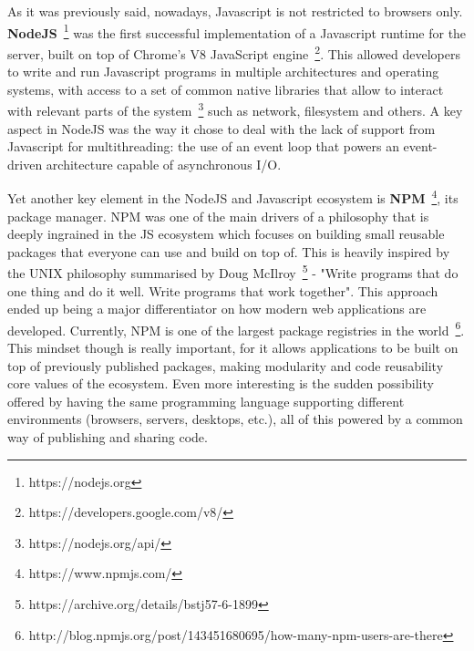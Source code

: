 As it was previously said, nowadays, Javascript is not restricted to
browsers only. \textbf{NodeJS}~\footnote{https://nodejs.org} was the first
successful implementation of a Javascript runtime for the server, built
on top of Chrome's V8 JavaScript engine~\footnote{https://developers.google.com/v8/}. This
allowed developers to write and run Javascript programs in multiple
architectures and operating systems, with access to a set of common
native libraries that allow to interact with relevant parts of the
system~\footnote{https://nodejs.org/api/} such as network, filesystem and
others. A key aspect in NodeJS was the way it chose to deal with the
lack of support from Javascript for multithreading: the use of an event
loop that powers an event-driven architecture capable of asynchronous
I/O.

Yet another key element in the NodeJS and Javascript ecosystem is
\textbf{NPM}~\footnote{https://www.npmjs.com/}, its package manager. NPM was one
of the main drivers of a philosophy that is deeply ingrained in the JS
ecosystem which focuses on building small reusable packages that
everyone can use and build on top of. This is heavily inspired by the
UNIX philosophy summarised by Doug McIlroy~\footnote{https://archive.org/details/bstj57-6-1899} - "Write
programs that do one thing and do it well. Write programs that work
together". This approach ended up being a major differentiator on how
modern web applications are developed. Currently, NPM is one of the
largest package registries in the world~\footnote{http://blog.npmjs.org/post/143451680695/how-many-npm-users-are-there}.
This mindset though is really important, for it allows applications to
be built on top of previously published packages, making modularity and
code reusability core values of the ecosystem. Even more interesting is
the sudden possibility offered by having the same programming language
supporting different environments (browsers, servers, desktops, etc.),
all of this powered by a common way of publishing and sharing code.

